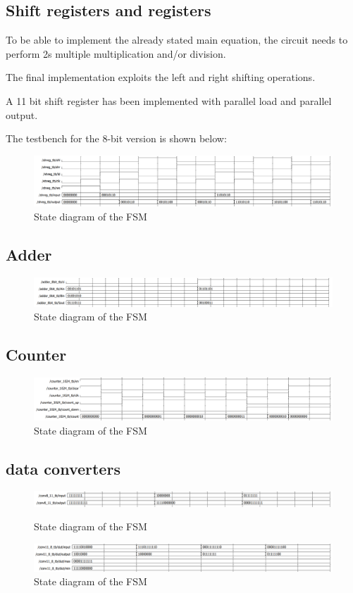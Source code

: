\documentclass[12pt]{article}
\begin{document}
\newpage
\subsection*{Shift registers and registers}

To be able to implement the already stated main equation, the circuit needs to perform 2s multiple multiplication and/or division.

The final implementation exploits the left and right shifting operations.

A 11 bit shift register has been implemented with parallel load and parallel output.

The testbench for the 8-bit version is shown below:
 
\begin{figure}[h]
	\centering
	\includegraphics[scale = 0.47]{immagini/shift_reg_tb.png}
	\caption{State diagram of the FSM}
\end{figure}

\newpage

\subsection*{Adder}

\begin{figure}[h]
	\centering
	\includegraphics[scale = 0.47]{immagini/adder_tb.png}
	\caption{State diagram of the FSM}
\end{figure}

\subsection*{Counter}

\begin{figure}[h]
	\centering
	\includegraphics[scale = 0.47]{immagini/counter_tb.png}
	\caption{State diagram of the FSM}
\end{figure}

\subsection*{data converters}

\begin{figure}[h]
	\centering
	\includegraphics[scale = 0.47]{immagini/8_11_tb.png}
	\caption{State diagram of the FSM}
	
	\centering
	\includegraphics[scale = 0.47]{immagini/11_8_tb.png}
	\caption{State diagram of the FSM}
\end{figure}
\end{document}
